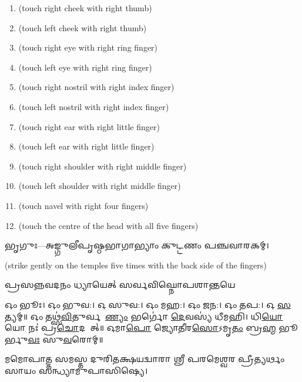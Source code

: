 \begin{enumerate}
    \item {} {\scriptsize (touch right cheek with right thumb)}
    \item {} {\scriptsize (touch left cheek with right thumb)}
    \item {} {\scriptsize (touch right eye with right ring finger)}
    \item {} {\scriptsize (touch left eye with right ring finger)}
    \item {} {\scriptsize (touch right nostril with right index finger)}
    \item {} {\scriptsize (touch left nostril with right index finger)}
    \item {} {\scriptsize (touch right ear with right little finger)}
    \item {} {\scriptsize (touch left ear with right little finger)}
    \item {} {\scriptsize (touch right shoulder with right middle finger)}
    \item {} {\scriptsize (touch left shoulder with right middle finger)}
    \item {} {\scriptsize (touch navel with right four fingers)}
    \item {} {\scriptsize (touch the centre of the head with all five fingers)}
\end{enumerate}



𑌭𑍃𑌗𑍁𑌃—𑌅𑌙𑍍𑌗𑍁𑌲𑍀𑌪𑍃𑌷𑍍𑌠𑌭𑌾𑌗𑌾𑌭𑍍𑌯𑌾𑌂 𑌕𑍁𑌟𑍍𑌟𑌣𑌂 𑌪𑌞𑍍𑌚𑌵𑌾𑌰𑌕𑌮𑍍।

{\scriptsize (strike gently on the temples five times with the back side of the fingers)}

{𑌪𑍍𑌰𑌸𑌨𑍍𑌨𑌵𑌦𑌨𑌂 𑌧𑍍𑌯𑌾𑌯𑍇𑌤𑍍 𑌸𑌰𑍍𑌵𑌵𑌿𑌘𑍍𑌨𑍋𑌪𑌶𑌾𑌨𑍍𑌤𑌯𑍇}


𑌓𑌂 𑌭𑍂𑌃। 𑌓𑌂 𑌭𑍁𑌵:। 𑌓 𑌸𑍁𑌵:। 𑌓𑌂 𑌮𑌹:। 𑌓𑌂 𑌜𑌨:। 𑌓𑌂 𑌤𑌪:। 𑌓 \ul{𑌸}𑌤𑍍𑌯𑌮𑍍॥
𑌓𑌂 𑌤𑌥𑍍𑌸॑\ul{𑌵𑌿}𑌤𑍁𑌰𑍍𑌵𑌰𑍇᳚\ul{𑌣𑍍𑌯𑌂} 𑌭𑌰𑍍𑌗𑍋॑ \ul{𑌦𑍇}𑌵𑌸𑍍𑌯॑ 𑌧𑍀𑌮𑌹𑌿। 𑌧𑌿\ul{𑌯𑍋} 𑌯𑍋 𑌨𑌃॑ 𑌪𑍍𑌰\ul{𑌚𑍋}𑌦𑌯𑌾᳚𑌤𑍍॥
𑌓𑌮𑌾\ul{𑌪𑍋} 𑌜𑍍𑌯𑍋\ul{𑌤𑍀}𑌰\ul{𑌸𑍋}𑌽𑌮𑍃\ul{𑌤𑌂} 𑌬𑍍𑌰\ul{𑌹𑍍𑌮} 𑌭𑍂𑌰𑍍𑌭𑍁\ul{𑌵𑌃} 𑌸𑍁\ul{𑌵}𑌰𑍋𑌮𑍍॥


𑌮𑌮𑍋𑌪𑌾𑌤𑍍𑌤 𑌸𑌮𑌸𑍍𑌤 𑌦𑍁𑌰𑌿𑌤𑌕𑍍𑌷𑌯𑌦𑍍𑌵𑌾𑌰𑌾 𑌶𑍍𑌰𑍀 𑌪𑌰𑌮𑍇𑌶𑍍𑌵𑌰 𑌪𑍍𑌰𑍀𑌤𑍍𑌯𑌰𑍍𑌥𑌂 𑌸𑌾𑌯𑌂 𑌸𑌨𑍍𑌧𑍍𑌯𑌾𑌮𑍁𑌪𑌾𑌸𑌿𑌷𑍍𑌯𑍇।

